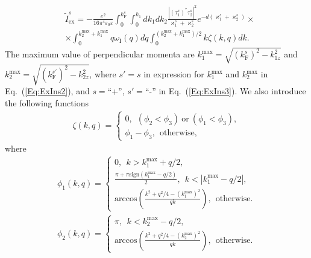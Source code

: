 \documentclass[aps,prb,amsmath,amssymb,twocolumn,superscriptaddress,showpacs,floatfix]{revtex4-1}
\begin{document}
\begin{equation}\label{Eq:ExIns3}
\begin{split}
&\tilde I^s_\mathrm{ex}= -\frac{e^2}{16\pi^4\varepsilon_0\varepsilon} \int_{0}^{k^s_\mathrm F}\int_{0}^{k_1}\!\!\! dk_{1}dk_{2} \frac{|(\tau^s_1)^*\tau^s_2|^2}{\varkappa_1^s +\varkappa_2^s} e^{-d(\varkappa^s_1+\varkappa^s_2)} \times \\ &\times \int_{0}^{k_2^{\mathrm{max}}+k_1^{\mathrm{max}}}q \omega_\mathrm I (q) dq \!\!\int_0^{(k_2^{\mathrm{max}}+k_1^{\mathrm{max}})/2}\!\!\! k\zeta(k,q)dk.
\end{split}
\end{equation}
The maximum value of perpendicular momenta
are $k_1^{\mathrm{max}}=\sqrt{(k^s_\mathrm F)^2 - k^2_{1z}}$ and
$k_2^{\mathrm{max}}=\sqrt{(k^{s'}_\mathrm F)^2 - k^2_{2z}}$, where $s'=s$
in expression for $k_1^\mathrm{max}$ and $k_2^\mathrm{max}$ in Eq.~(\ref{Eq:ExIns2}),
and $s=$``+'', $s'=$``-'' in Eq.~(\ref{Eq:ExIns3}). We also introduce the following functions
\begin{equation}\label{Eq:InPlaneInt2}
\begin{split}
\zeta (k,q) = \left\{\begin{array}{l}0,~~(\phi_2<\phi_3)~ \mathrm{or}~ (\phi_1<\phi_3),\\
\phi_1-\phi_3,~~\mathrm{otherwise,}\end{array}\right.
\end{split}
\end{equation}
where
\begin{equation}\label{Eq:InPlaneInt3}
\begin{split}
\phi_1(k,q)=\left\{\begin{array}{l}0,~~k>k_1^{\mathrm{max}}+q/2,\\
\frac{\pi+\pi\mathrm{sign}(k_1^{\mathrm{max}}-q/2)}{2},~~k<|k_1^{\mathrm{max}}-q/2|,\\
\mathrm{arccos}\left(\frac{k^2+q^2/4-(k_1^{\mathrm{max}})^2}{qk}\right),~~\mathrm{otherwise}. \end{array}\right.
\end{split}
\end{equation}
\begin{equation}\label{Eq:InPlaneInt4}
\begin{split}
\phi_2(k,q)=\left\{\begin{array}{l}\pi,~~k<k_2^{\mathrm{max}}-q/2,\\
\mathrm{arccos}\left(\frac{k^2+q^2/4-(k_2^{\mathrm{max}})^2}{qk}\right),~~\mathrm{otherwise}. \end{array}\right.
\end{split}
\end{equation}
\end{document}
